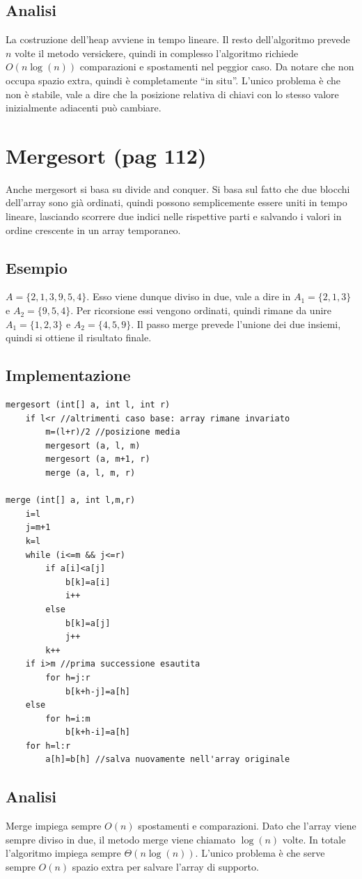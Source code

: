 \documentclass[a4paper]{book}
\begin{document}
\subsection*{Analisi}
La costruzione dell'heap avviene in tempo lineare. Il resto dell'algoritmo prevede $n$ volte il metodo versickere, quindi in complesso l'algoritmo richiede $O(n \log (n))$ comparazioni e spostamenti nel peggior caso. Da notare che non occupa spazio extra, quindi è completamente ``in situ''. L'unico problema è che non è stabile, vale a dire che la posizione relativa di chiavi con lo stesso valore inizialmente adiacenti può cambiare. 

\section{Mergesort (pag 112)}
Anche mergesort si basa su divide and conquer. Si basa sul fatto che due blocchi dell'array sono già ordinati, quindi possono semplicemente essere uniti in tempo lineare, lasciando scorrere due indici nelle rispettive parti e salvando i valori in ordine crescente in un array temporaneo.

\subsection*{Esempio}
$A=\{2, 1, 3, 9, 5, 4\}$. Esso viene dunque diviso in due, vale a dire in $A_1 =\{2,1,3\}$ e $A_2 =\{9,5,4\}$. Per ricorsione essi vengono ordinati, quindi rimane da unire $A_1 =\{1,2,3\}$ e $A_2 =\{4,5,9\}$. Il passo merge prevede l'unione dei due insiemi, quindi si ottiene il risultato finale.

\subsection*{Implementazione}
\begin{lstlisting}
mergesort (int[] a, int l, int r)
	if l<r //altrimenti caso base: array rimane invariato
		m=(l+r)/2 //posizione media
		mergesort (a, l, m)
		mergesort (a, m+1, r)
		merge (a, l, m, r)
		
merge (int[] a, int l,m,r)
	i=l
	j=m+1
	k=l
	while (i<=m && j<=r)
		if a[i]<a[j]
			b[k]=a[i]
			i++
		else
			b[k]=a[j]
			j++
		k++
	if i>m //prima successione esautita
		for h=j:r
			b[k+h-j]=a[h]
	else
		for h=i:m
			b[k+h-i]=a[h]
	for h=l:r
		a[h]=b[h] //salva nuovamente nell'array originale									
\end{lstlisting}
\subsection*{Analisi}
Merge impiega sempre $O(n)$ spostamenti e comparazioni. Dato che l'array viene sempre diviso in due, il metodo merge viene chiamato $\log(n)$ volte. In totale l'algoritmo impiega sempre $\Theta (n \log(n))$. L'unico problema è che serve sempre $O(n)$ spazio extra per salvare l'array di supporto.
\end{document}

